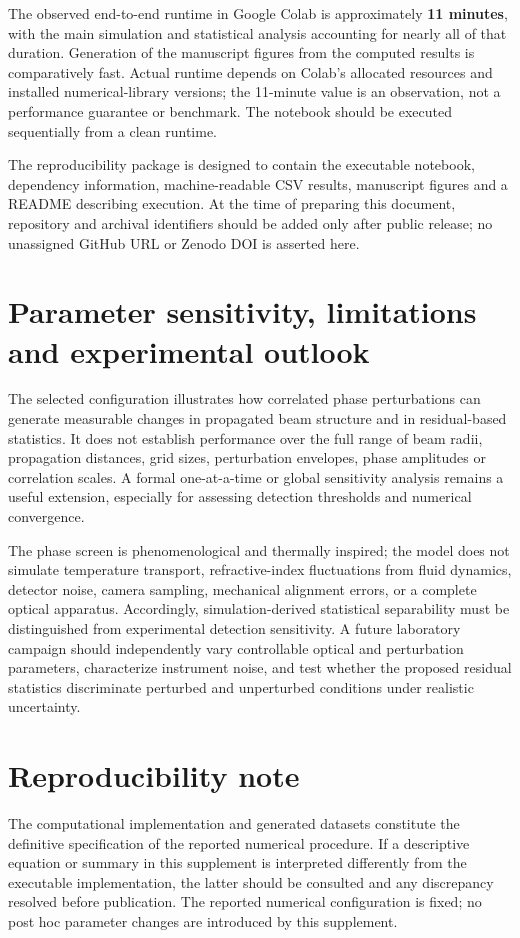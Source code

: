 \documentclass[11pt,a4paper]{article}
\begin{document}
The observed end-to-end runtime in Google Colab is approximately \textbf{11 minutes}, with the main simulation and statistical analysis accounting for nearly all of that duration. Generation of the manuscript figures from the computed results is comparatively fast. Actual runtime depends on Colab's allocated resources and installed numerical-library versions; the 11-minute value is an observation, not a performance guarantee or benchmark. The notebook should be executed sequentially from a clean runtime.

The reproducibility package is designed to contain the executable notebook, dependency information, machine-readable CSV results, manuscript figures and a README describing execution. At the time of preparing this document, repository and archival identifiers should be added only after public release; no unassigned GitHub URL or Zenodo DOI is asserted here.

\section{Parameter sensitivity, limitations and experimental outlook}
The selected configuration illustrates how correlated phase perturbations can generate measurable changes in propagated beam structure and in residual-based statistics. It does not establish performance over the full range of beam radii, propagation distances, grid sizes, perturbation envelopes, phase amplitudes or correlation scales. A formal one-at-a-time or global sensitivity analysis remains a useful extension, especially for assessing detection thresholds and numerical convergence.

The phase screen is phenomenological and thermally inspired; the model does not simulate temperature transport, refractive-index fluctuations from fluid dynamics, detector noise, camera sampling, mechanical alignment errors, or a complete optical apparatus. Accordingly, simulation-derived statistical separability must be distinguished from experimental detection sensitivity. A future laboratory campaign should independently vary controllable optical and perturbation parameters, characterize instrument noise, and test whether the proposed residual statistics discriminate perturbed and unperturbed conditions under realistic uncertainty.

\section*{Reproducibility note}
The computational implementation and generated datasets constitute the definitive specification of the reported numerical procedure. If a descriptive equation or summary in this supplement is interpreted differently from the executable implementation, the latter should be consulted and any discrepancy resolved before publication. The reported numerical configuration is fixed; no post hoc parameter changes are introduced by this supplement.
\end{document}
